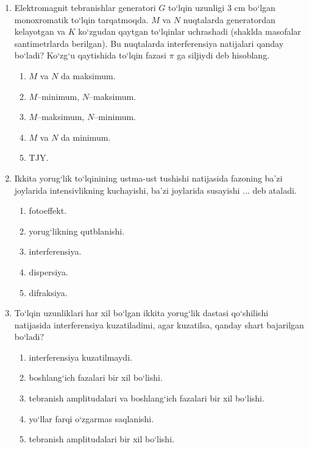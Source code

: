 \begin{enumerate}
\item Elektromagnit tebranishlar generatori $G$ to‘lqin uzunligi 3 cm bo‘lgan monoxromatik to‘lqin tarqatmoqda. $M$ va $N$ nuqtalarda generatordan kelayotgan va $K$ ko‘zgudan qaytgan to‘lqinlar uchrashadi (shaklda masofalar santimetrlarda berilgan). Bu nuqtalarda interferensiya natijalari qanday bo‘ladi? Ko‘zg‘u qaytishida to‘lqin fazasi $\pi$ ga siljiydi deb hisoblang.


\begin{enumerate}[label=\Alph*)]
\item $M$ va $N$ da maksimum.
\item $M$--minimum, $N$--maksimum.
\item $M$--maksimum, $N$--minimum.
\item $M$ va $N$ da minimum.
\item TJY.
\end{enumerate}


\item Ikkita yorug‘lik to‘lqinining ustma-ust tushishi natijasida fazoning ba’zi joylarida intensivlikning kuchayishi, ba’zi joylarida susayishi ... deb ataladi.
\begin{enumerate}[label=\Alph*)]
\item fotoeffekt.
\item yorug‘likning qutblanishi.
\item interferensiya.
\item dispersiya.
\item difraksiya.
\end{enumerate}

\item To‘lqin uzunliklari har xil bo‘lgan ikkita yorug‘lik dastasi qo‘shilishi natijasida interferensiya kuzatiladimi, agar kuzatilsa, qanday shart bajarilgan bo‘ladi?
\begin{enumerate}[label=\Alph*)]
\item interferensiya kuzatilmaydi.
\item boshlang‘ich fazalari bir xil bo‘lishi.
\item tebranish amplitudalari va boshlang‘ich fazalari bir xil bo‘lishi.
\item yo‘llar farqi o‘zgarmas saqlanishi.
\item tebranish amplitudalari bir xil bo‘lishi.
\end{enumerate}


\end{enumerate}
